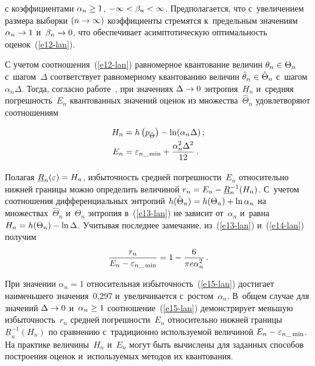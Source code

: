 \begin{multicols}{2}
\noindent
с коэффициентами $\alpha_n\hm\geq 1$, $-\infty \hm< \beta_n\hm< \infty$. Предполагается, что 
с~увеличением размера выборки $(n\hm\to \infty)$ коэффициенты стремятся к~предельным 
значениям $\alpha_n\hm\to 1$ и~$\beta_n\hm\to 0$, что обеспечивает асимптотическую 
оптимальность оценок~(\ref{e12-lan}). 

С учетом соотношения~(\ref{e12-lan}) равномерное квантование величин $\theta_n\hm\in 
\Theta_n$ с~шагом~$\Delta$ соответствует равномерному квантованию величин 
$\hat{\theta}_n\hm\in \hat{\Theta}_n$ с~шагом~$\alpha_n\Delta$. Тогда, согласно  
работе~\cite{10-lan}, при значениях $\Delta\hm\to 0$ энтропия~$H_n$ и~средняя 
погрешность~$E_n$ квантованных значений оценок из множества~$\hat{\Theta}_n$ 
удовле\-тво\-ря\-ют соотношениям 

\pagebreak

\noindent
\begin{align}
H_n&= h\left(p_{\hat{\Theta}}\right)-\ln(\alpha_n\Delta)\,;\label{e13-lan}\\
E_n&= \varepsilon_{n\_\min} +\displaystyle\frac{\displaystyle \alpha_n^2\Delta^2\mathstrut}{\displaystyle 12\mathstrut}\,.\label{e14-lan}
\end{align}

Полагая $\underline{R}_n(\varepsilon)\hm=H_n$, избыточность средней погрешности~$E_n$ 
относительно нижней границы мож\-но определить величиной $r_n\hm= E_n\hm- 
\underline{R}_n^{-1} (H_n)$. С~учетом соотношения дифференциальных энтропий 
$h(\hat{\Theta}_n) \hm= h(\Theta_n) \hm+ \ln\alpha_n$ на множествах~$\hat{\Theta}_n$ 
и~$\Theta_n$ энтропия в~(\ref{e13-lan}) не зависит от~$\alpha_n$ и~равна $H_n\hm= h(\Theta_n) 
\hm- \ln\Delta$. Учитывая последнее замечание, из~(\ref{e13-lan}) и~(\ref{e14-lan}) получим 
\begin{equation}
\displaystyle\frac{\displaystyle r_n\mathstrut}{\displaystyle E_n-\varepsilon_{n\_\min}\mathstrut}= 1-\displaystyle\frac{\displaystyle 6\mathstrut}{\displaystyle \pi e \alpha_n^2\mathstrut}\,.
\label{e15-lan}
\end{equation}

При значении $\alpha_n=1$ относительная из\-бы\-точ\-ность~(\ref{e15-lan}) достигает наименьшего 
значения~0,297 и~увеличивается с~рос\-том~$\alpha_n$. В~общем случае для значений 
$\Delta\hm\to 0$ и~$\alpha_n\hm\geq 1$ соотношение~(\ref{e15-lan}) демонстрирует меньшую 
избыточность~$r_n$ средней по\-греш\-ности~$E_n$ относительно нижней границы 
$\underline{R}_n^{-1}(H_n)$ по сравнению с~традиционно используемой величиной  $E_n\hm- 
\varepsilon_{n\_\min}$. На практике величины~$H_n$ и~$E_n$ могут быть вы\-чис\-ле\-ны для 
заданных способов построения оценок и~ис\-поль\-зу\-емых методов их квантования. 


\end{multicols}
